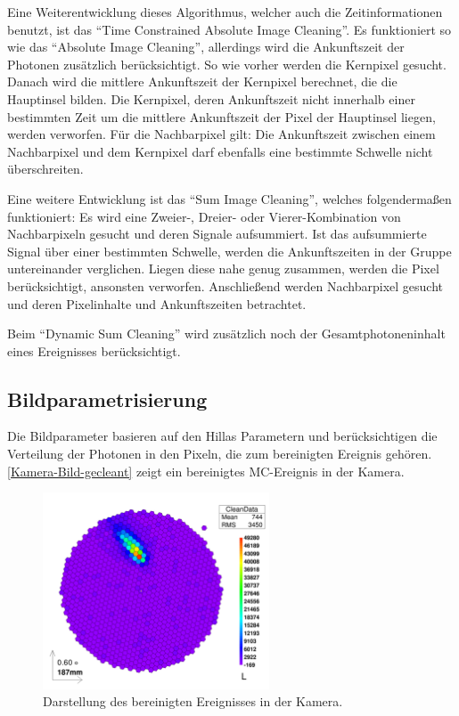 Eine Weiterentwicklung dieses Algorithmus, welcher auch die Zeitinformationen benutzt, ist das ``Time Constrained Absolute Image Cleaning''. 
Es funktioniert so wie das ``Absolute Image Cleaning'', allerdings wird die Ankunftszeit der Photonen zusätzlich berücksichtigt.
So wie vorher werden die Kernpixel gesucht. 
Danach wird die mittlere Ankunftszeit der Kernpixel berechnet, die die Hauptinsel bilden.
Die Kernpixel, deren Ankunftszeit nicht innerhalb einer bestimmten Zeit um die mittlere Ankunftszeit der Pixel der Hauptinsel liegen, werden verworfen.
Für die Nachbarpixel gilt: Die Ankunftszeit zwischen einem Nachbarpixel und dem Kernpixel darf ebenfalls eine bestimmte Schwelle nicht überschreiten.

Eine weitere Entwicklung ist das ``Sum Image Cleaning'', welches folgendermaßen funktioniert:
Es wird eine Zweier-, Dreier- oder Vierer-Kombination von Nachbarpixeln gesucht und deren Signale aufsummiert.
Ist das aufsummierte Signal über einer bestimmten Schwelle, werden die Ankunftszeiten in der Gruppe untereinander verglichen. 
Liegen diese nahe genug zusammen, werden die Pixel berücksichtigt, ansonsten verworfen.
Anschließend werden Nachbarpixel gesucht und deren Pixelinhalte und Ankunftszeiten betrachtet.

Beim ``Dynamic Sum Cleaning'' wird zusätzlich noch der Gesamtphotoneninhalt eines Ereignisses berücksichtigt.

\subsection{Bildparametrisierung}
Die Bildparameter basieren auf den Hillas Parametern \cite{Hillas} und berücksichtigen die Verteilung der Photonen in den Pixeln, die zum bereinigten Ereignis gehören.
\autoref{Kamera-Bild-gecleant} zeigt ein bereinigtes MC-Ereignis in der Kamera.

\begin{figure}
    \centering
    \includegraphics[width=0.6\textwidth]{./Plots/03_MonteCarlos/Signal_gecleant_fertig.png}
    \caption{Darstellung des bereinigten Ereignisses in der Kamera.}
    \label{Kamera-Bild-gecleant}
\end{figure}


